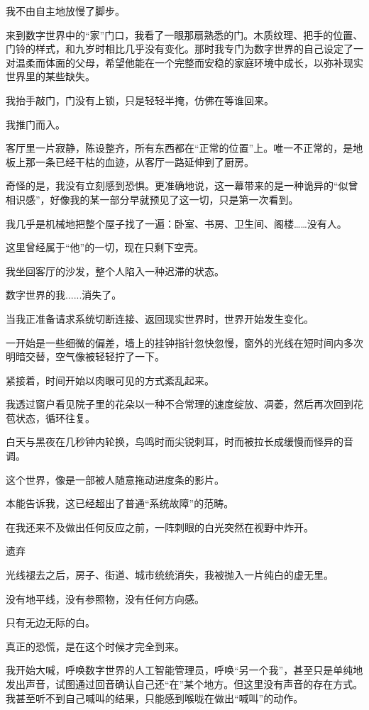 我不由自主地放慢了脚步。

来到数字世界中的“家”门口，我看了一眼那扇熟悉的门。木质纹理、把手的位置、门铃的样式，和九岁时相比几乎没有变化。那时我专门为数字世界的自己设定了一对温柔而体面的父母，希望他能在一个完整而安稳的家庭环境中成长，以弥补现实世界里的某些缺失。

我抬手敲门，门没有上锁，只是轻轻半掩，仿佛在等谁回来。

我推门而入。

客厅里一片寂静，陈设整齐，所有东西都在“正常的位置”上。唯一不正常的，是地板上那一条已经干枯的血迹，从客厅一路延伸到了厨房。

奇怪的是，我没有立刻感到恐惧。更准确地说，这一幕带来的是一种诡异的“似曾相识感”，好像我的某一部分早就预见了这一切，只是第一次看到。

我几乎是机械地把整个屋子找了一遍：卧室、书房、卫生间、阁楼……没有人。

这里曾经属于“他”的一切，现在只剩下空壳。

我坐回客厅的沙发，整个人陷入一种迟滞的状态。

数字世界的我......消失了。

当我正准备请求系统切断连接、返回现实世界时，世界开始发生变化。

一开始是一些细微的偏差，墙上的挂钟指针忽快忽慢，窗外的光线在短时间内多次明暗交替，空气像被轻轻拧了一下。

紧接着，时间开始以肉眼可见的方式紊乱起来。

我透过窗户看见院子里的花朵以一种不合常理的速度绽放、凋萎，然后再次回到花苞状态，循环往复。

白天与黑夜在几秒钟内轮换，鸟鸣时而尖锐刺耳，时而被拉长成缓慢而怪异的音调。

这个世界，像是一部被人随意拖动进度条的影片。

本能告诉我，这已经超出了普通“系统故障”的范畴。

在我还来不及做出任何反应之前，一阵刺眼的白光突然在视野中炸开。

遗弃

光线褪去之后，房子、街道、城市统统消失，我被抛入一片纯白的虚无里。

没有地平线，没有参照物，没有任何方向感。

只有无边无际的白。

真正的恐慌，是在这个时候才完全到来。

我开始大喊，呼唤数字世界的人工智能管理员，呼唤“另一个我”，甚至只是单纯地发出声音，试图通过回音确认自己还“在”某个地方。但这里没有声音的存在方式。我甚至听不到自己喊叫的结果，只能感到喉咙在做出“喊叫”的动作。

